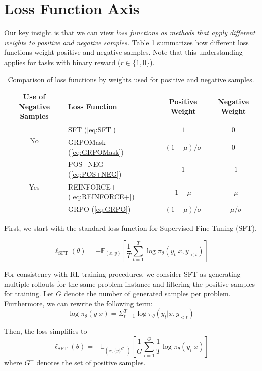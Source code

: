\documentclass[12pt]{cmuthesis}
\begin{document}
\section{Loss Function Axis}
Our key insight is that we can view \emph{loss functions as methods that apply different weights to positive and negative samples.} Table \ref{tab:loss_function_comparison} summarizes how different loss functions weight positive and negative samples. Note that this understanding applies for tasks with binary reward ($r \in \{1, 0\}$).

\begin{table}[h!]
\centering
\begin{tabular}{clcc}
\toprule
\textbf{Use of Negative Samples} & \textbf{Loss Function} & \textbf{Positive Weight} & \textbf{Negative Weight} \\
\midrule
\multirow{2}{*}{No} & SFT (\ref{eq:SFT}) & $1$ & $0$ \\
& GRPOMask (\ref{eq:GRPOMask}) & $(1 - \mu)/\sigma$ & $0$ \\
\midrule 
\multirow{3}{*}{Yes} & POS+NEG (\ref{eq:POS+NEG}) & $1$ & $-1$ \\
& REINFORCE+ (\ref{eq:REINFORCE+}) & $1 - \mu$ & $- \mu$ \\
& GRPO (\ref{eq:GRPO}) & $(1 - \mu)/\sigma$ & $-\mu/\sigma$ \\
\bottomrule
\end{tabular}
\caption{Comparison of loss functions by weights used for positive and negative samples.}
\label{tab:loss_function_comparison}
\end{table}

First, we start with the standard loss function for Supervised Fine-Tuning (SFT).

\[ \ell_{\text{SFT}}(\theta) = - \mathbb{E}_{(x, y)} \left[ \frac{1}{T} \sum_{t = 1}^T \log \pi_\theta(y_t \vert x, y_{< t}) \right] \]

For consistency with RL training procedures, we consider SFT as generating multiple rollouts for the same problem instance and filtering the positive samples for training. Let $G$ denote the number of generated samples per problem. Furthermore, we can rewrite the following term:
\[
    \log \pi_\theta(y \vert x) = \Sigma_{t = 1}^T \log \pi_\theta(y_t \vert x, y_{< t})
\]

Then, the loss simplifies to 
\[
    \ell_{\text{SFT}}(\theta) = - \mathbb{E}_{(x, \{y\}^{G^+})} \left[ \frac{1}{G} \sum_{i = 1}^G \frac{1}{T} \log \pi_\theta(y_i \vert x) \right]
\]
where $G^+$ denotes the set of positive samples.
\end{document}
